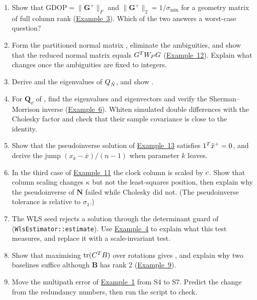 \documentclass[main.tex]{subfiles}
\begin{document}
\begin{enumerate}[leftmargin=*, itemsep=2pt]
\item Show that $\mathrm{GDOP} = \lVert\bm{G}^{+}\rVert_F$ and
      $\lVert\bm{G}^{+}\rVert_2 = 1/\sigma_{\min}$ for a geometry matrix of
      full column rank (\hyperref[la:ex3]{Example~3}).  Which of the two
      answers a worst-case question?
\item Form the partitioned normal matrix , eliminate
      the ambiguities, and show that the reduced normal matrix equals
      $G^{T}W_PG$ (\hyperref[la:ex12]{Example~12}).
      Explain what changes once the ambiguities are fixed to integers.
\item Derive  and the eigenvalues of $Q_{\hat N}$, and show
      .
\item For $\bm{Q}_{\dd{}}$ of , find the eigenvalues and
      eigenvectors and verify the Sherman--Morrison inverse
      (\hyperref[la:ex6]{Example~6}).  Whiten simulated double differences
      with the Cholesky factor and check that their sample covariance is
      close to the identity.
\item Show that the pseudoinverse solution of \hyperref[la:ex13]{Example~13}
      satisfies $1^{T}\hat{x}^{+} = 0$, and derive the jump
      $(x_k - \bar{x})/(n-1)$ when parameter $k$ leaves.
\item In the third case of \hyperref[la:ex11]{Example~11} the clock column
      is scaled by $c$.  Show that column scaling changes $\kappa$ but
      not the least-squares position, then explain why the pseudoinverse of
      $\bm{N}$ failed while Cholesky did not.  (The pseudoinverse tolerance
      is relative to $\sigma_1$.)
\item The WLS seed rejects a solution through the determinant guard of
       (\texttt{WlsEstimator::estimate}).  Use
      \hyperref[la:ex4]{Example~4} to explain what this test measures, and
      replace it with a scale-invariant test.
\item Show that maximising $\operatorname{tr}(C^{T}B)$ over
      rotations gives , and explain why two baselines
      suffice although $\bm{B}$ has rank 2 (\hyperref[la:ex9]{Example~9}).
\item Move the multipath error of \hyperref[la:ex1]{Example~1} from S4 to
      S7.  Predict the change from the redundancy numbers, then run the
      script to check.
\end{enumerate}
\end{document}
